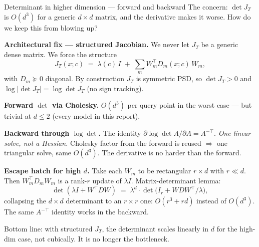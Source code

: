\documentclass[10pt,aspectratio=169]{beamer}
\begin{document}
\begin{frame}{Determinant in higher dimension --- forward and backward}
  The concern: $\det J_T$ is $O(d^3)$ for a generic $d \times d$ matrix, and the derivative makes it worse. How do we keep this from blowing up?

  \medskip
  \textbf{Architectural fix --- structured Jacobian.} We never let $J_T$ be a generic dense matrix. We force the structure
  \[
    J_T(x; c) \;=\; \lambda(c)\, I \;+\; \sum_{m} W_m^\top D_m(x;c)\, W_m,
  \]
  with $D_m \succeq 0$ diagonal. By construction $J_T$ is symmetric PSD, so $\det J_T > 0$ and $\log|\det J_T| = \log\det J_T$ (no sign tracking).

  \medskip
  \textbf{Forward $\det$ via Cholesky.} $O(d^3)$ per query point in the worst case --- but trivial at $d \le 2$ (every model in this report).

  \medskip
  \textbf{Backward through $\log\det$.} The identity $\partial \log\det A / \partial A = A^{-\top}$. \emph{One linear solve, not a Hessian.} Cholesky factor from the forward is reused $\Rightarrow$ one triangular solve, same $O(d^3)$. The derivative is no harder than the forward.

  \medskip
  \textbf{Escape hatch for high $d$.} Take each $W_m$ to be rectangular $r \times d$ with $r \ll d$. Then $W_m^\top D_m W_m$ is a rank-$r$ update of $\lambda I$. Matrix-determinant lemma:
  \[
    \det(\lambda I + W^\top D W) \;=\; \lambda^d \cdot \det\!\big(I_r + W D W^\top / \lambda\big),
  \]
  collapsing the $d \times d$ determinant to an $r \times r$ one: $O(r^3 + rd)$ instead of $O(d^3)$. The same $A^{-\top}$ identity works in the backward.

  \medskip
  Bottom line: with structured $J_T$, the determinant scales linearly in $d$ for the high-dim case, not cubically. It is no longer the bottleneck.
\end{frame}
\end{document}
